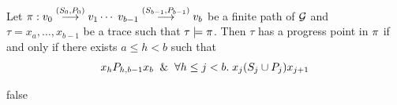 \begin{proposition}\label{prop:progresing-and-P}
Let $\pi: v_0 \stackrel{(S_0,P_0)}{\longrightarrow} v_1 \cdots \; v_{b-1} \stackrel{(S_{b-1},P_{b-1})}{\longrightarrow} v_{b}$ be a finite path of $\mathcal{G}$
and $\tau = x_a, \ldots , x_{b-1}$ be a trace such that $\tau \models \pi$. Then $\tau$ has a progress point in $\pi$ if and only if
there exists $a \leq h < b$ such that
\[x_h P_{h,b-1} x_b \And \forall h \leq j < b.\; x_j (S_j \cup P_j) x_{j+1}\]
\end{proposition}

%
%
%
%



\if false

